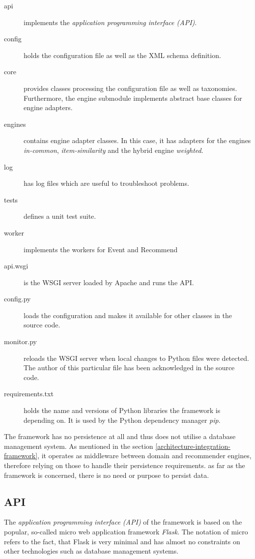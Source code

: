 \begin{description}
    \item[api] implements the \emph{application programming interface (API)}.
    \item[config] holds the configuration file as well as the XML schema definition.
    \item[core] provides classes processing the configuration file as well as taxonomies. Furthermore, the engine submodule implements abstract base classes for engine adapters.
    \item[engines] contains engine adapter classes. In this case, it has adapters for the engines \emph{in-common}, \emph{item-similarity} and the hybrid engine \emph{weighted}.
    \item[log] has log files which are useful to troubleshoot problems.
    \item[tests] defines a unit test suite.
    \item[worker] implements the workers for Event and Recommend
    \item[api.wsgi] is the WSGI server loaded by Apache and runs the API.
    \item[config.py] loads the configuration and makes it available for other classes in the source code.
    \item[monitor.py] reloads the WSGI server when local changes to Python files were detected. The author of this particular file has been acknowledged in the source code.
    \item[requirements.txt] holds the name and versions of Python libraries the framework is depending on. It is used by the Python dependency manager \emph{pip}.
\end{description}

The framework has no persistence at all and thus does not utilise a database management system. As mentioned in the section \ref{architecture-integration-framework}, it operates as middleware between domain and recommender engines, therefore relying on those to handle their persistence requirements. as far as the framework is concerned, there is no need or purpose to persist data.

\subsection{API}

The \emph{application programming interface (API)} of the framework is based on the popular, so-called micro web application framework \emph{Flask}. The notation of micro refers to the fact, that Flask is very minimal and has almost no constraints on other technologies such as database management systems.

